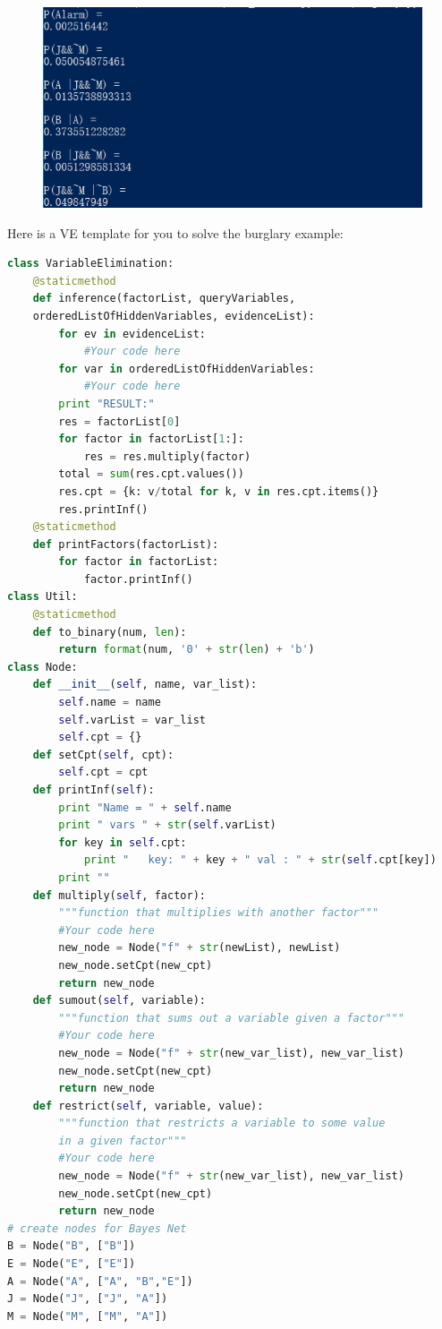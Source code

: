 ﻿\documentclass[a4paper, 11pt]{article}
\begin{document}
\begin{figure}[ht]
\centering
\includegraphics[width=12cm]{Pic/burglar_result}
\end{figure}
Here is a VE template for you to solve the burglary example:
\begin{lstlisting}[language=Python,frame=single]
class VariableElimination:
    @staticmethod
    def inference(factorList, queryVariables,
    orderedListOfHiddenVariables, evidenceList):
        for ev in evidenceList:
            #Your code here
        for var in orderedListOfHiddenVariables:
            #Your code here
        print "RESULT:"
        res = factorList[0]
        for factor in factorList[1:]:
            res = res.multiply(factor)
        total = sum(res.cpt.values())
        res.cpt = {k: v/total for k, v in res.cpt.items()}
        res.printInf()
    @staticmethod
    def printFactors(factorList):
        for factor in factorList:
            factor.printInf()
class Util:
    @staticmethod
    def to_binary(num, len):
        return format(num, '0' + str(len) + 'b')
class Node:
    def __init__(self, name, var_list):
        self.name = name
        self.varList = var_list
        self.cpt = {}
    def setCpt(self, cpt):
        self.cpt = cpt
    def printInf(self):
        print "Name = " + self.name
        print " vars " + str(self.varList)
        for key in self.cpt:
            print "   key: " + key + " val : " + str(self.cpt[key])
        print ""
    def multiply(self, factor):
        """function that multiplies with another factor"""
        #Your code here
        new_node = Node("f" + str(newList), newList)
        new_node.setCpt(new_cpt)
        return new_node
    def sumout(self, variable):
        """function that sums out a variable given a factor"""
        #Your code here
        new_node = Node("f" + str(new_var_list), new_var_list)
        new_node.setCpt(new_cpt)
        return new_node
    def restrict(self, variable, value):
        """function that restricts a variable to some value
        in a given factor"""
        #Your code here
        new_node = Node("f" + str(new_var_list), new_var_list)
        new_node.setCpt(new_cpt)
        return new_node
# create nodes for Bayes Net
B = Node("B", ["B"])
E = Node("E", ["E"])
A = Node("A", ["A", "B","E"])
J = Node("J", ["J", "A"])
M = Node("M", ["M", "A"])


\end{lstlisting}
\end{document}
